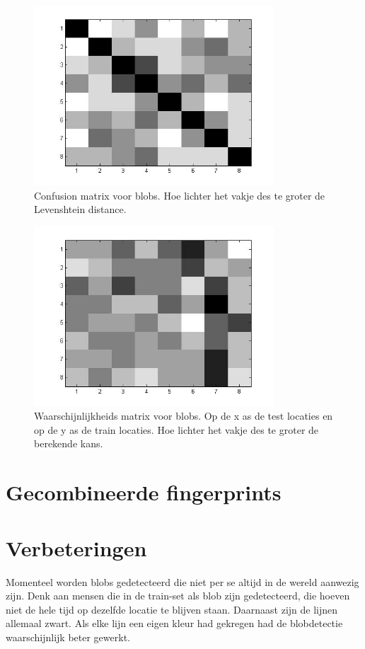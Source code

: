\documentclass[a4paper]{article}
\begin{document}
\begin{figure}[h]
	\centering
	\includegraphics[width=0.8\textwidth]{confusion_blob.jpg}
	\caption{Confusion matrix voor blobs. Hoe lichter het vakje des te groter de Levenshtein distance.}
	\label{fig:confusion_blob}
\end{figure}

\begin{figure}[h]
	\centering
	\includegraphics[width=0.8\textwidth]{blob_prob.jpg}
	\caption{Waarschijnlijkheids matrix voor blobs. Op de x as de test locaties en op de y as de train locaties. Hoe lichter het vakje des te groter de berekende kans.}
	\label{fig:blob_prob}
\end{figure}

\section{Gecombineerde fingerprints}

\section{Verbeteringen}
Momenteel worden blobs gedetecteerd die niet per se altijd in de wereld aanwezig zijn. Denk aan mensen die in de train-set als blob zijn gedetecteerd, die hoeven niet de hele tijd op dezelfde locatie te blijven staan. Daarnaast zijn de lijnen allemaal zwart. Als elke lijn een eigen kleur had gekregen had de blobdetectie waarschijnlijk beter gewerkt.
\end{document}
